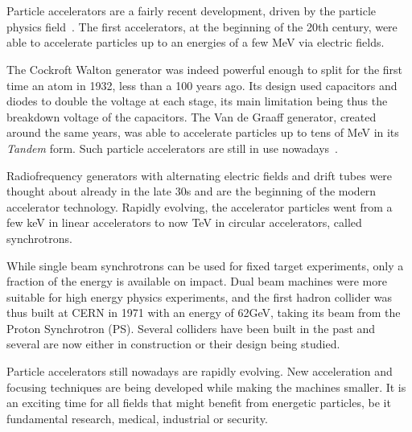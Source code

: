 \section{}


Particle accelerators are a fairly recent development, driven by the particle physics
field~\cite{bryant_brief_1994}. The first accelerators, at the beginning of the 20th century, were
able to accelerate particles up to an energies of a few MeV via electric fields.

The Cockroft Walton generator was indeed powerful enough to split for the first time an atom in
1932, less than a 100 years ago. Its design used capacitors and diodes to double the voltage at each
stage, its main limitation being thus the breakdown voltage of the capacitors.
The Van de Graaff generator, created around the same years, was able to accelerate particles up to
tens of MeV in its \textit{Tandem} form. Such particle accelerators are still in use
nowadays~\cite{lebois_rapport_2020}.

Radiofrequency generators with alternating electric fields and drift tubes were thought about
already in the late 30s and are the beginning of the modern accelerator technology.
Rapidly evolving, the accelerator particles went from a few keV in linear accelerators to now TeV in 
circular accelerators, called synchrotrons.

While single beam synchrotrons can be used for fixed target experiments, only a fraction of the
energy is available on impact. Dual beam machines were more suitable for high energy physics
experiments, and the first hadron collider was thus built at CERN in 1971 with an energy of 62GeV,
taking its beam from the Proton Synchrotron (PS). Several colliders have been built in the past and
several are now either in construction or their design being studied.

Particle accelerators still nowadays are rapidly evolving. New acceleration and focusing techniques
are being developed while making the machines smaller. It is an exciting time for all fields that
might benefit from energetic particles, be it fundamental research, medical, industrial or security.



